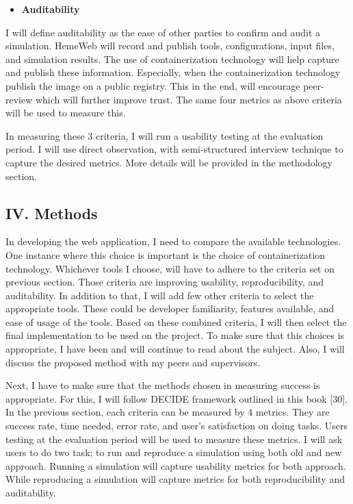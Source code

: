 \documentclass[]{article}
\providecommand{\tightlist}{%
  \setlength{\itemsep}{0pt}\setlength{\parskip}{0pt}}
\begin{document}
\begin{itemize}
\tightlist
\item
  \textbf{Auditability}
\end{itemize}

I will define auditability as the ease of other parties to confirm and
audit a simulation. HemeWeb will record and publish tools,
configurations, input files, and simulation results. The use of
containerization technology will help capture and publish these
information. Especially, when the containerization technology publish
the image on a public registry. This in the end, will encourage
peer-review which will further improve trust. The same four metrics as
above criteria will be used to measure this.

In measuring these 3 criteria, I will run a usability testing at the
evaluation period. I will use direct observation, with semi-structured
interview technique to capture the desired metrics. More details will be
provided in the methodology section.

\subsection{IV. Methods}\label{iv.-methods}

In developing the web application, I need to compare the available
technologies. One instance where this choice is important is the choice
of containerization technology. Whichever tools I choose, will have to
adhere to the criteria set on previous section. Those criteria are
improving usability, reproducibility, and auditability. In addition to
that, I will add few other criteria to select the appropriate tools.
These could be developer familiarity, features available, and ease of
usage of the tools. Based on these combined criteria, I will then select
the final implementation to be used on the project. To make sure that
this choices is appropriate, I have been and will continue to read about
the subject. Also, I will discuss the proposed method with my peers and
supervisors.

Next, I have to make sure that the methods chosen in measuring success
is appropriate. For this, I will follow DECIDE framework outlined in
this book {[}30{]}. In the previous section, each criteria can be
measured by 4 metrics. They are success rate, time needed, error rate,
and user's satisfaction on doing tasks. Users testing at the evaluation
period will be used to measure these metrics. I will ask users to do two
task; to run and reproduce a simulation using both old and new approach.
Running a simulation will capture usability metrics for both approach.
While reproducing a simulation will capture metrics for both
reproducibility and auditability.
\end{document}
